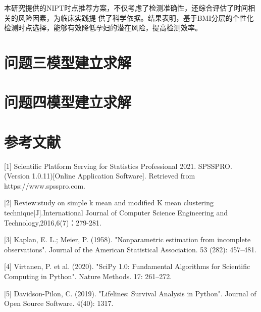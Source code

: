 \documentclass{article}
\begin{document}
本研究提供的NIPT时点推荐方案，不仅考虑了检测准确性，还综合评估了时间相关的风险因素，为临床实践提
供了科学依据。结果表明，基于BMI分层的个性化检测时点选择，能够有效降低孕妇的潜在风险，提高检测效率。
\section{\textbf{问题三模型建立求解}}
\section{\textbf{问题四模型建立求解}}
\section{\textbf{参考文献}}
 [1] Scientific Platform Serving for Statistics Professional 2021. SPSSPRO.
(Version 1.0.11)[Online Application Software]. Retrieved from https://www.spsspro.com.

[2] Review:study on simple k mean and modified K mean clustering
technique[J].International Journal of Computer Science Engineering and Technology,2016,6(7)：279-281.

[3] Kaplan, E. L.; Meier, P. (1958). "Nonparametric estimation from incomplete
observations". Journal of the American Statistical Association. 53 (282): 457–481.

[4] Virtanen, P. et al. (2020). "SciPy 1.0: Fundamental Algorithms for Scientific
Computing in Python". Nature Methods. 17: 261–272.

[5] Davidson-Pilon, C. (2019). "Lifelines: Survival Analysis in Python". Journal
of Open Source Software. 4(40): 1317.
\end{document}
